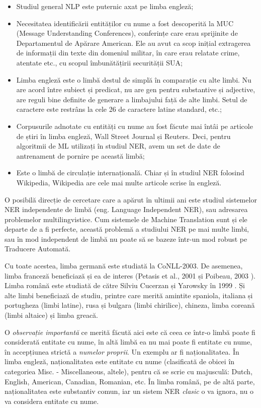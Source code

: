 \begin{itemize}
	\item Studiul general NLP este puternic axat pe limba engleză;
	\item Necesitatea identificării entităților cu nume a fost descoperită la MUC (Message Understanding Conferences), conferințe care erau sprijinite de Departamentul de Apărare American. Ele au avut ca scop inițial extragerea de informații din texte din domeniul militar, în care erau relatate crime, atentate etc., cu scopul îmbunătățirii securității SUA;
	\item Limba engleză este o limbă destul de simplă în comparație cu alte limbi. Nu are acord între subiect și predicat, nu are gen pentru substantive și adjective, are reguli bine definite de generare a limbajului față de alte limbi. Setul de caractere este restrâns la cele 26 de caractere latine standard, etc.;
	\item Corpusurile adnotate cu entități cu nume au fost făcute mai întâi pe articole de știri în limba engleză, Wall Street Journal și Reuters. Deci, pentru algoritmii de ML utilizați în studiul NER, avem un set de date de antrenament de pornire pe această limbă;
	\item Este o limbă de circulație internațională. Chiar și în studiul NER folosind Wikipedia, Wikipedia are cele mai multe articole scrise în engleză.
\end{itemize}


O posibilă direcție de cercetare care a apărut în ultimii ani este studiul sistemelor NER independente de limbă (eng. Language Independent NER), sau adresarea problemelor multilingvistice. Cum sistemele de Machine Translation  sunt și ele departe de a fi perfecte, această problemă a studiului NER pe mai multe limbi, sau în mod independent de limbă nu poate să se bazeze într-un mod robust pe Traducere Automată.

Cu toate acestea, limba germană este studiată la CoNLL-2003\cite{conll2003}. De asemenea, limba franceză beneficiază și ea de interes (Petasis et al., 2001 \cite{Petasis01usingmachine} și Poibeau, 2003 \cite{And03themultilingual}). Limba română este studiată de către Silviu Cucerzan și Yarowsky în 1999 \cite{Cucerzan99languageindependent}. Și alte limbi beneficiază de studiu, printre care merită amintite spaniola, italiana și portugheza (limbi latine), rusa și bulgara (limbi chirilice), chineza, limba coreană (limbi altaice) și limba greacă.

O \textit{observație importantă} ce merită făcută aici este că ceea ce într-o limbă poate fi considerată entitate cu nume, în altă limbă ea nu mai poate fi entitate cu nume, în accepțiunea strictă a \textit{numelor proprii}. Un exemplu ar fi naționalitatea. În limba engleză, naționalitatea este entitate cu nume (clasificată de obicei în categoriea Misc. - Miscellaneous, altele), pentru că se scrie cu majusculă: Dutch, English, American, Canadian, Romanian, etc. În limba română, pe de altă parte, naționalitatea este substantiv comun, iar un sistem NER \textit{clasic} o va ignora, nu o va considera entitate cu nume.

